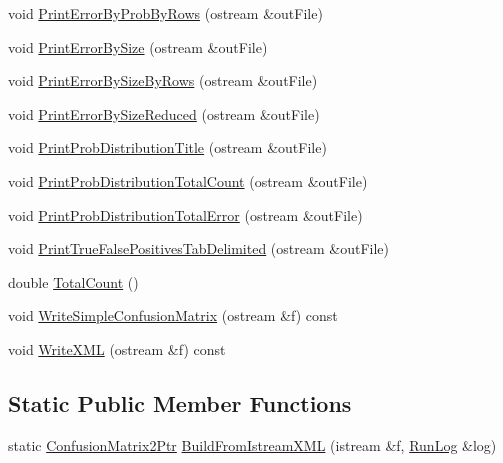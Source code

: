 \begin{DoxyCompactItemize}
void \hyperlink{class_k_k_m_l_l_1_1_confusion_matrix2_affe7dfa4a82a45d72dbc0b1f7c9fbbea}{Print\+Error\+By\+Prob\+By\+Rows} (ostream \&out\+File)
\item 
void \hyperlink{class_k_k_m_l_l_1_1_confusion_matrix2_aec72957398cc77f25926475d16c9e67e}{Print\+Error\+By\+Size} (ostream \&out\+File)
\item 
void \hyperlink{class_k_k_m_l_l_1_1_confusion_matrix2_a52a232c72d6030267fd32628fb1effdd}{Print\+Error\+By\+Size\+By\+Rows} (ostream \&out\+File)
\item 
void \hyperlink{class_k_k_m_l_l_1_1_confusion_matrix2_a177dd308fa4aadc3e66f0c839d0c3a3b}{Print\+Error\+By\+Size\+Reduced} (ostream \&out\+File)
\item 
void \hyperlink{class_k_k_m_l_l_1_1_confusion_matrix2_a98bfa5b223f8b50e43d242dffb1e4d06}{Print\+Prob\+Distribution\+Title} (ostream \&out\+File)
\item 
void \hyperlink{class_k_k_m_l_l_1_1_confusion_matrix2_a4773a126fdd6a49bc288fe82757e8b32}{Print\+Prob\+Distribution\+Total\+Count} (ostream \&out\+File)
\item 
void \hyperlink{class_k_k_m_l_l_1_1_confusion_matrix2_a5cdd62a1e722754611868a67c3a97f15}{Print\+Prob\+Distribution\+Total\+Error} (ostream \&out\+File)
\item 
void \hyperlink{class_k_k_m_l_l_1_1_confusion_matrix2_a535e8ad57dcde379ccf958b1f78671ff}{Print\+True\+False\+Positives\+Tab\+Delimited} (ostream \&out\+File)
\item 
double \hyperlink{class_k_k_m_l_l_1_1_confusion_matrix2_aff44039aef6ff3524a1639d39e320809}{Total\+Count} ()
\item 
void \hyperlink{class_k_k_m_l_l_1_1_confusion_matrix2_a1961546f61564c059b00506156331451}{Write\+Simple\+Confusion\+Matrix} (ostream \&f) const 
\item 
void \hyperlink{class_k_k_m_l_l_1_1_confusion_matrix2_af7d5bc45536b15073e24a6b397c4a5c3}{Write\+X\+ML} (ostream \&f) const 
\end{DoxyCompactItemize}
\subsection*{Static Public Member Functions}
\begin{DoxyCompactItemize}
\item 
static \hyperlink{class_k_k_m_l_l_1_1_confusion_matrix2_a5e15dd38f24b2b85399c2e43d649bb9a}{Confusion\+Matrix2\+Ptr} \hyperlink{class_k_k_m_l_l_1_1_confusion_matrix2_a32cb66eab0f8b1ece3f87a94afbf4fcc}{Build\+From\+Istream\+X\+ML} (istream \&f, \hyperlink{class_k_k_b_1_1_run_log}{Run\+Log} \&log)
\end{DoxyCompactItemize}


